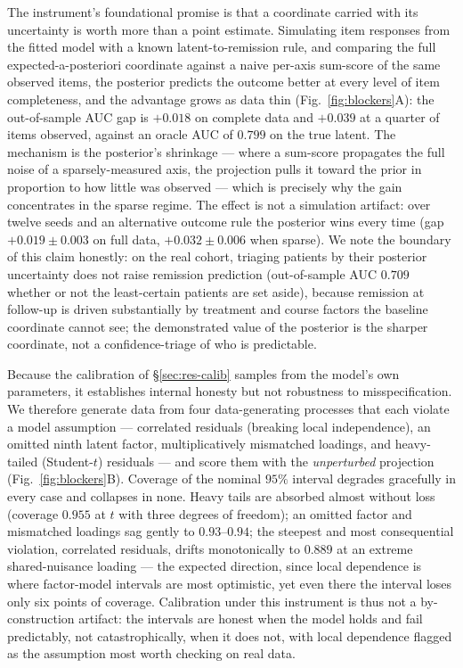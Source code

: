 The instrument's foundational promise is that a coordinate carried with its
uncertainty is worth more than a point estimate. Simulating item responses from the
fitted model with a known latent-to-remission rule, and comparing the full
expected-a-posteriori coordinate against a naive per-axis sum-score of the same
observed items, the posterior predicts the outcome better at every level of item
completeness, and the advantage grows as data thin
(Fig.~\ref{fig:blockers}A): the out-of-sample AUC gap is $+0.018$ on complete data
and $+0.039$ at a quarter of items observed, against an oracle AUC of $0.799$ on the
true latent. The mechanism is the posterior's shrinkage --- where a sum-score
propagates the full noise of a sparsely-measured axis, the projection pulls it
toward the prior in proportion to how little was observed --- which is precisely why
the gain concentrates in the sparse regime. The effect is not a simulation artifact:
over twelve seeds and an alternative outcome rule the posterior wins every time (gap
$+0.019\pm0.003$ on full data, $+0.032\pm0.006$ when sparse). We note the boundary of
this claim honestly: on the real cohort, triaging patients by their posterior
uncertainty does not raise remission prediction (out-of-sample AUC $0.709$ whether
or not the least-certain patients are set aside), because remission at follow-up is
driven substantially by treatment and course factors the baseline coordinate cannot
see; the demonstrated value of the posterior is the sharper coordinate, not a
confidence-triage of who is predictable.

Because the calibration of \S\ref{sec:res-calib} samples from the model's own
parameters, it establishes internal honesty but not robustness to misspecification.
We therefore generate data from four data-generating processes that each violate a
model assumption --- correlated residuals (breaking local independence), an omitted
ninth latent factor, multiplicatively mismatched loadings, and heavy-tailed
(Student-$t$) residuals --- and score them with the \emph{unperturbed} projection
(Fig.~\ref{fig:blockers}B). Coverage of the nominal $95\%$ interval degrades
gracefully in every case and collapses in none. Heavy tails are absorbed almost
without loss (coverage $0.955$ at $t$ with three degrees of freedom); an omitted
factor and mismatched loadings sag gently to $0.93$--$0.94$; the steepest and most
consequential violation, correlated residuals, drifts monotonically to $0.889$ at an
extreme shared-nuisance loading --- the expected direction, since local dependence is
where factor-model intervals are most optimistic, yet even there the interval loses
only six points of coverage. Calibration under this instrument is thus not a
by-construction artifact: the intervals are honest when the model holds and fail
predictably, not catastrophically, when it does not, with local dependence flagged
as the assumption most worth checking on real data.
